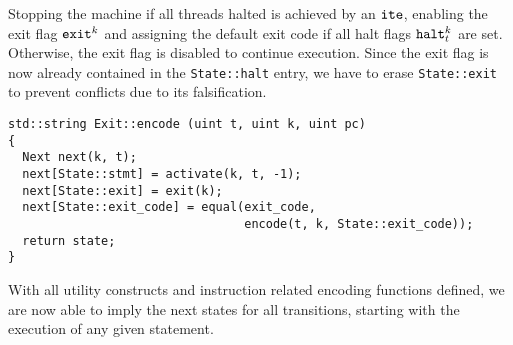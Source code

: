 \noindent
Stopping the machine if all threads halted is achieved by an $\texttt{ite}$, enabling the exit flag $\texttt{exit}^k$ and assigning the default exit code if all halt flags $\texttt{halt}^k_t$ are set.
Otherwise, the exit flag is disabled to continue execution.
Since the exit flag is now already contained in the \texttt{State::halt} entry, we have to erase \texttt{State::exit} to prevent conflicts due to its falsification. %


\begin{lstlisting}[style=c++, style=encode]
std::string Exit::encode (uint t, uint k, uint pc)
{
  Next next(k, t);
  next[State::stmt] = activate(k, t, -1);
  next[State::exit] = exit(k);
  next[State::exit_code] = equal(exit_code,
                                 encode(t, k, State::exit_code));
  return state;
}
\end{lstlisting}

\newpage




\noindent
With all utility constructs and instruction related encoding functions defined, we are now able to imply the next states for all transitions, starting with the execution of any given statement.

